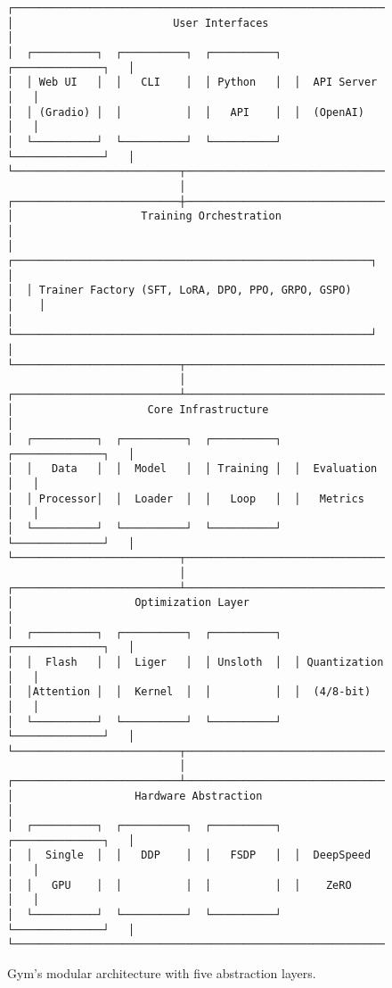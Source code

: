 \documentclass[11pt,letterpaper]{article}
\begin{document}
\begin{figure}[h]
\centering
\begin{verbatim}
┌─────────────────────────────────────────────────────────────────┐
│                         User Interfaces                          │
│  ┌──────────┐  ┌──────────┐  ┌──────────┐  ┌──────────────┐   │
│  │ Web UI   │  │   CLI    │  │ Python   │  │  API Server  │   │
│  │ (Gradio) │  │          │  │   API    │  │  (OpenAI)    │   │
│  └──────────┘  └──────────┘  └──────────┘  └──────────────┘   │
└──────────────────────────┬──────────────────────────────────────┘
                           │
┌──────────────────────────┼──────────────────────────────────────┐
│                    Training Orchestration                        │
│  ┌────────────────────────────────────────────────────────┐    │
│  │ Trainer Factory (SFT, LoRA, DPO, PPO, GRPO, GSPO)     │    │
│  └────────────────────────────────────────────────────────┘    │
└──────────────────────────┬──────────────────────────────────────┘
                           │
┌──────────────────────────┴──────────────────────────────────────┐
│                     Core Infrastructure                          │
│  ┌──────────┐  ┌──────────┐  ┌──────────┐  ┌──────────────┐   │
│  │   Data   │  │  Model   │  │ Training │  │  Evaluation  │   │
│  │ Processor│  │  Loader  │  │   Loop   │  │   Metrics    │   │
│  └──────────┘  └──────────┘  └──────────┘  └──────────────┘   │
└──────────────────────────┬──────────────────────────────────────┘
                           │
┌──────────────────────────┴──────────────────────────────────────┐
│                   Optimization Layer                             │
│  ┌──────────┐  ┌──────────┐  ┌──────────┐  ┌──────────────┐   │
│  │  Flash   │  │  Liger   │  │ Unsloth  │  │ Quantization │   │
│  │Attention │  │  Kernel  │  │          │  │  (4/8-bit)   │   │
│  └──────────┘  └──────────┘  └──────────┘  └──────────────┘   │
└──────────────────────────┬──────────────────────────────────────┘
                           │
┌──────────────────────────┴──────────────────────────────────────┐
│                   Hardware Abstraction                           │
│  ┌──────────┐  ┌──────────┐  ┌──────────┐  ┌──────────────┐   │
│  │  Single  │  │   DDP    │  │   FSDP   │  │  DeepSpeed   │   │
│  │   GPU    │  │          │  │          │  │    ZeRO      │   │
│  └──────────┘  └──────────┘  └──────────┘  └──────────────┘   │
└─────────────────────────────────────────────────────────────────┘
\end{verbatim}
\caption{Gym's modular architecture with five abstraction layers.}
\label{fig:architecture}
\end{figure}
\end{document}
